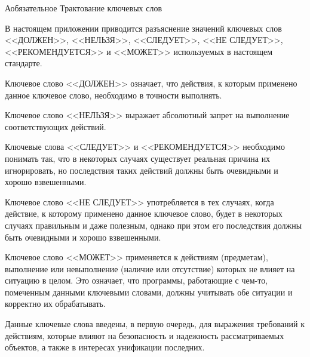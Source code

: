 \begin{appendix}{А}{обязательное}
{Трактование ключевых слов}
\label{KEYWORDS}

\mbox{}

В настоящем приложении приводится разъяснение значений ключевых слов 
<<ДОЛЖЕН>>, <<НЕЛЬЗЯ>>, <<СЛЕДУЕТ>>, <<НЕ СЛЕДУЕТ>>, <<РЕКОМЕНДУЕТСЯ>> и <<МОЖЕТ>> 
используемых в настоящем стандарте. 

Ключевое слово <<ДОЛЖЕН>> означает, что действия, к которым применено данное 
ключевое слово, необходимо в точности выполнять. 

Ключевое слово <<НЕЛЬЗЯ>> выражает абсолютный запрет на выполнение 
соответствующих действий. 

Ключевые слова <<СЛЕДУЕТ>> и <<РЕКОМЕНДУЕТСЯ>> необходимо понимать так, что в 
некоторых случаях существует реальная причина их игнорировать, но 
последствия таких действий должны быть очевидными и хорошо взвешенными. 

Ключевое слово <<НЕ СЛЕДУЕТ>> употребляется в тех случаях, когда действие, к 
которому применено данное ключевое слово, будет в некоторых случаях 
правильным и даже полезным, однако при этом его последствия должны быть 
очевидными и хорошо взвешенными. 

Ключевое слово <<МОЖЕТ>> применяется к действиям (предметам), выполнение или 
невыполнение (наличие или отсутствие) которых не влияет на ситуацию в 
целом. Это означает, что программы, работающие с чем-то, помеченным 
данными ключевыми словами, должны учитывать обе ситуации и корректно их 
обрабатывать. 

Данные ключевые слова введены, в первую очередь, для выражения требований 
к действиям, которые влияют на безопасность и надежность рассматриваемых 
объектов, а также в интересах унификации последних. 

\end{appendix}

\mbox{}
\vfill
\mbox{}
\clearpage
